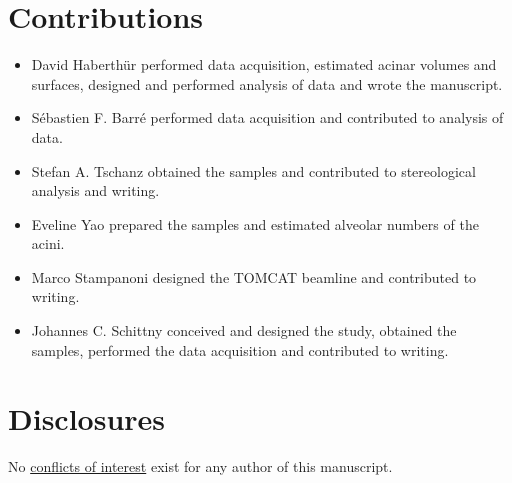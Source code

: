 \documentclass[final,paper=a4,DIV=calc,abstract,english]{scrartcl}
\begin{document}
\section*{Contributions}
\begin{itemize}
	\item David Haberthür performed data acquisition, estimated acinar volumes and surfaces, designed and performed analysis of data and wrote the manuscript.
	\item Sébastien F. Barré performed data acquisition and contributed to analysis of data.
	\item Stefan A. Tschanz obtained the samples and contributed to stereological analysis and writing.
	\item Eveline Yao prepared the samples and estimated alveolar numbers of the acini.
	\item Marco Stampanoni designed the TOMCAT beamline and contributed to writing.
	\item Johannes C. Schittny conceived and designed the study, obtained the samples, performed the data acquisition and contributed to writing.
\end{itemize}

\section*{Disclosures}
No \href{http://www.the-aps.org/mm/Publications/Preparing-Your-Manuscript#conflicts}{conflicts of interest} exist for any author of this manuscript.

\clearpage
\listoffigures

\clearpage
\doublespacing


\end{document}
